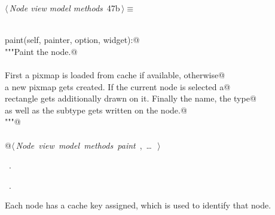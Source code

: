 \documentclass[
    a4paper,      %
    10pt,         %
    openright,    %
    notitlepage,  %
    parskip=half, %
]{scrreprt}       %
\theoremstyle{definition}                    %
\begin{document}
\begin{flushleft} \small
\begin{minipage}{\linewidth}\label{scrap64}\raggedright\small
{} $\langle\,${\itshape Node view model methods}\nobreak\ {\footnotesize {47b}}$\,\rangle\equiv$
\vspace{-1exm}
\begin{list}{}{} \item
\mbox{}\lstinline@@\\
\mbox{}\lstinline@def paint(self, painter, option, widget):@\\
\mbox{}\lstinline@    """Paint the node.@\\
\mbox{}\lstinline@@\\
\mbox{}\lstinline@    First a pixmap is loaded from cache if available, otherwise@\\
\mbox{}\lstinline@    a new pixmap gets created. If the current node is selected a@\\
\mbox{}\lstinline@    rectangle gets additionally drawn on it. Finally the name, the type@\\
\mbox{}\lstinline@    as well as the subtype gets written on the node.@\\
\mbox{}\lstinline@    """@\\
\mbox{}\lstinline@@\\
\mbox{}\lstinline@    @\hbox{$\langle\,${\itshape Node view model methods paint}\nobreak\ {\footnotesize {}, \ldots\ }$\,\rangle$}\lstinline@@\\
\mbox{}\lstinline@@{\NWsep}
\end{list}
\vspace{-1.5ex}
\footnotesize
\begin{list}{}{\setlength{\itemsep}{-\parsep}\setlength{\itemindent}{-\leftmargin}}
\item \NWtxtMacroDefBy\ .
\item \NWtxtMacroRefIn\ .

\item{}
\end{list}
\end{minipage}\vspace{4ex}
\end{flushleft}
Each node has a cache key assigned, which is used to identify that node.
\end{document}
